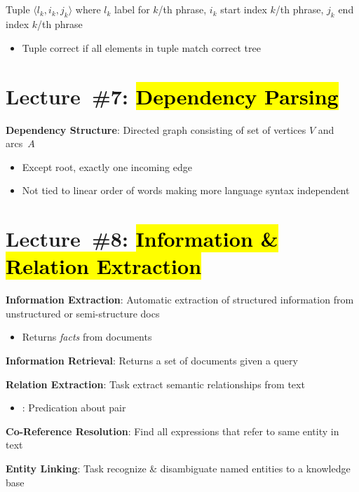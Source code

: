\documentclass[9pt]{extarticle}
\renewcommand{\green}[1]{{\color{ForestGreen} #1}}
\newcommand{\greenbf}[1]{\textbf{\green{#1}}}
\newcommand{\redbf}[1]{\textbf{\red{#1}}}
\begin{document}
\begin{multicols}{3}
  \subsection*{}

  Tuple ${\langle l_k, i_k, j_k  \rangle}$ where $l_k$ label for $k$\-/th phrase, $i_k$ start index $k$\-/th phrase, $j_k$ end index $k$\-/th phrase
  \begin{itemize}
    \item Tuple correct if all elements in tuple match correct tree
  \end{itemize}

  \section*{Lecture~\#7: \hl{Dependency Parsing}}

  \greenbf{Dependency Structure}: Directed graph consisting of set of vertices $V$ and arcs~$A$
  \begin{itemize}
    \item Except root, exactly one incoming edge
    \item Not tied to linear order of words making more language syntax independent
  \end{itemize}

  \section*{Lecture~\#8: \hl{Information \& Relation Extraction}}

  \greenbf{Information Extraction}: Automatic extraction of structured information from unstructured or semi-structure docs
  \begin{itemize}
    \item Returns \textit{facts} from documents
  \end{itemize}

  \greenbf{Information Retrieval}: Returns a set of documents given a query

  \greenbf{Relation Extraction}: Task extract semantic relationships from text
  \begin{itemize}
    \item \redbf{Relation}: Predication about pair
  \end{itemize}

  \greenbf{Co-Reference Resolution}: Find all expressions that refer to same entity in text

  \greenbf{Entity Linking}: Task recognize \& disambiguate named entities to a knowledge base


\end{multicols}
\end{document}

